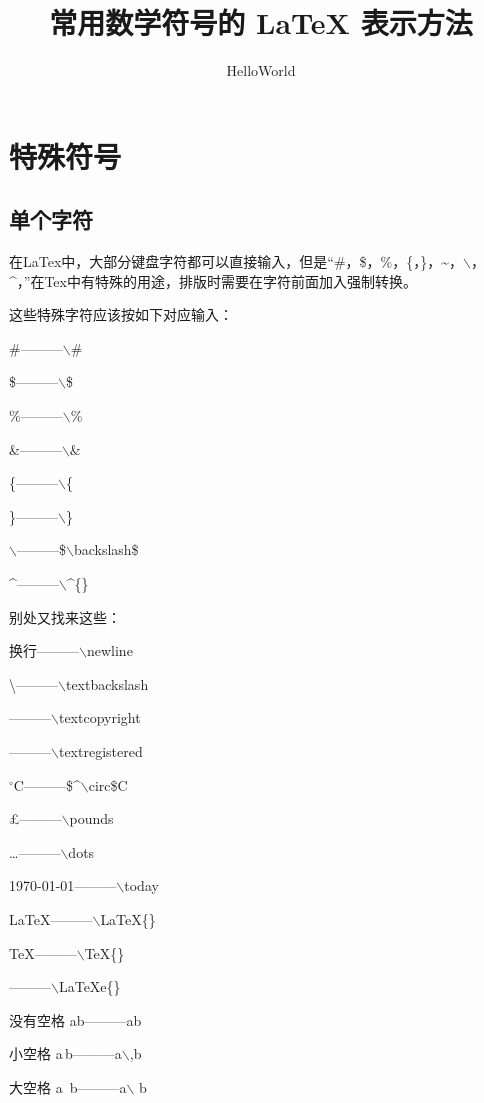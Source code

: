 \documentclass[UTF8]{ctexart}
\author{HelloWorld}
\title{常用数学符号的 LaTeX 表示方法}
\begin{document}
\maketitle

\section{特殊符号}

\subsection{单个字符}

在LaTex中，大部分键盘字符都可以直接输入，但是“\#，\$，\%，\{，\}，\~{}，$\backslash$，\^{}，”在Tex中有特殊的用途，排版时需要在字符前面加入强制转换。

这些特殊字符应该按如下对应输入：

\#---------$\backslash$\#

\$---------$\backslash$\$

\%---------$\backslash$\%

\&---------$\backslash$\&

\{---------$\backslash$\{

\}---------$\backslash$\}

$\backslash$---------\$$\backslash$backslash\$

\^{}---------$\backslash$\^{}\{\}

别处又找来这些：

换行---------$\backslash$newline

\textbackslash---------$\backslash$textbackslash

\textcopyright---------$\backslash$textcopyright

\textregistered---------$\backslash$textregistered

$^\circ$C---------\$\^{}$\backslash$circ\$C

\pounds---------$\backslash$pounds 

\dots---------$\backslash$dots

\today---------$\backslash$today  

\LaTeX{}---------$\backslash$LaTeX\{\}

\TeX{}---------$\backslash$TeX\{\} 

\LaTeXe{}---------$\backslash$LaTeXe\{\}

没有空格 ab---------ab

小空格	a\,b---------a$\backslash$,b

大空格	a\ b---------a$\backslash$ b
\end{document}
